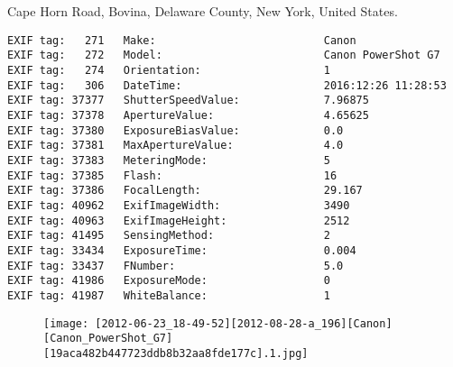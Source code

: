\section{\protect{}}
\noindent Cape Horn Road, Bovina, Delaware County, New York, United States.
\noindent
\begin{lstlisting}
EXIF tag:   271   Make:                          Canon
EXIF tag:   272   Model:                         Canon PowerShot G7
EXIF tag:   274   Orientation:                   1
EXIF tag:   306   DateTime:                      2016:12:26 11:28:53
EXIF tag: 37377   ShutterSpeedValue:             7.96875
EXIF tag: 37378   ApertureValue:                 4.65625
EXIF tag: 37380   ExposureBiasValue:             0.0
EXIF tag: 37381   MaxApertureValue:              4.0
EXIF tag: 37383   MeteringMode:                  5
EXIF tag: 37385   Flash:                         16
EXIF tag: 37386   FocalLength:                   29.167
EXIF tag: 40962   ExifImageWidth:                3490
EXIF tag: 40963   ExifImageHeight:               2512
EXIF tag: 41495   SensingMethod:                 2
EXIF tag: 33434   ExposureTime:                  0.004
EXIF tag: 33437   FNumber:                       5.0
EXIF tag: 41986   ExposureMode:                  0
EXIF tag: 41987   WhiteBalance:                  1

\end{lstlisting}
\clearpage
\begin{figure}
\raggedleft
\texttt{[image: [2012-06-23\_18-49-52][2012-08-28-a\_196][Canon][Canon\_PowerShot\_G7][19aca482b447723ddb8b32aa8fde177c].1.jpg]}
\end{figure}


\clearpage
